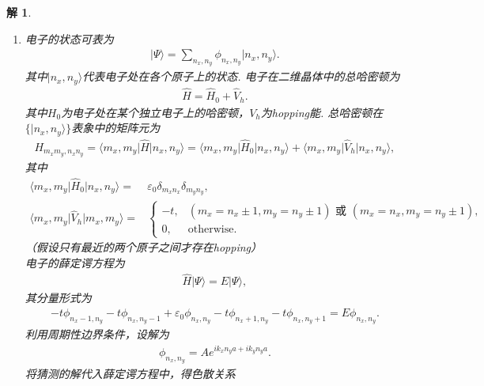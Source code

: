 \documentclass[UTF8,10pt,a4paper]{article}
\theoremstyle{Problem}
\theoremstyle{Solution}
\newtheorem*{sol}{解}
\begin{document}
\begin{sol}
    \begin{enumerate}
        \item[(a)] 电子的状态可表为
        \begin{align}
            \lvert\Psi\rangle=\sum_{n_x,n_y}\phi_{n_x,n_y}\lvert n_x,n_y\rangle.
        \end{align}
        其中$\lvert n_x,n_y\rangle$代表电子处在各个原子上的状态.
        电子在二维晶体中的总哈密顿为
        \begin{align}
            \hat{H}=\hat{H}_0+\hat{V}_h.
        \end{align}
        其中$H_0$为电子处在某个独立电子上的哈密顿，$V_h$为hopping能. 总哈密顿在$\{\lvert n_x,n_y\rangle\}$表象中的矩阵元为
        \begin{align}
            H_{m_xm_y,n_xn_y}=\langle m_x,m_y\lvert\hat{H}\rvert n_x,n_y\rangle=\langle m_x,m_y\rvert\hat{H}_0\lvert n_x,n_y\rangle+\langle m_x,m_y\rvert\hat{V}_h\lvert n_x,n_y\rangle,
        \end{align}
        其中
        \begin{align}
            \langle m_x,m_y\rvert\hat{H}_0\lvert n_x,n_y\rangle=&\varepsilon_0\delta_{m_xn_x}\delta_{m_yn_y},\\
            \langle m_x,m_y\rvert\hat{V}_h\lvert m_x,m_y\rangle=&\left\{\begin{array}{ll}
                -t,&(m_x=n_x\pm 1,m_y=n_y\pm 1)\text{ 或 }(m_x=n_x,m_y=n_y\pm 1),\\
                0,&\text{otherwise}.
            \end{array}\right.
        \end{align}
        （假设只有最近的两个原子之间才存在hopping）\\
        电子的薛定谔方程为
        \begin{align}
            \hat{H}\lvert\Psi\rangle=E\lvert\Psi\rangle,
        \end{align}
        其分量形式为
        \begin{align}
            -t\phi_{n_x-1,n_y}-t\phi_{n_x,n_y-1}+\varepsilon_0\phi_{n_x,n_y}-t\phi_{n_x+1,n_y}-t\phi_{n_x,n_y+1}=E\phi_{n_x,n_y}.
        \end{align}
        利用周期性边界条件，设解为
        \begin{align}
            \phi_{n_x,n_y}=Ae^{ik_xn_ya+ik_yn_ya}.
        \end{align}
        将猜测的解代入薛定谔方程中，得色散关系
        \begin{align}

\end{align}
\end{enumerate}
\end{sol}
\end{document}
